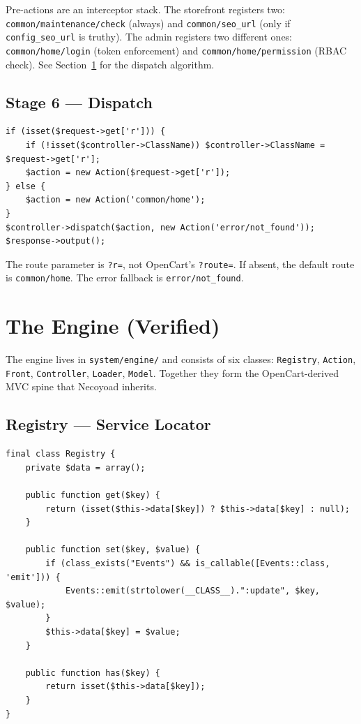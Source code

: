 \documentclass[11pt,a4paper]{article}
\begin{document}
Pre-actions are an interceptor stack. The storefront registers two:
\texttt{common/maintenance/check} (always) and \texttt{common/seo\_url}
(only if \texttt{config\_seo\_url} is truthy). The admin registers
two different ones: \texttt{common/home/login} (token enforcement)
and \texttt{common/home/permission} (RBAC check). See
Section~\ref{sec:engine} for the dispatch algorithm.

\subsection{Stage 6 --- Dispatch}

\begin{lstlisting}[caption={Dispatch in \texttt{web/index.php}.},label={lst:dispatch}]
if (isset($request->get['r'])) {
    if (!isset($controller->ClassName)) $controller->ClassName = $request->get['r'];
    $action = new Action($request->get['r']);
} else {
    $action = new Action('common/home');
}
$controller->dispatch($action, new Action('error/not_found'));
$response->output();
\end{lstlisting}

The route parameter is \texttt{?r=}, not OpenCart's \texttt{?route=}.
If absent, the default route is \texttt{common/home}. The error
fallback is \texttt{error/not\_found}.

\section{The Engine (Verified)}\label{sec:engine}

The engine lives in \texttt{system/engine/} and consists of six
classes: \texttt{Registry}, \texttt{Action}, \texttt{Front},
\texttt{Controller}, \texttt{Loader}, \texttt{Model}. Together they
form the OpenCart-derived MVC spine that Necoyoad inherits.

\subsection{Registry --- Service Locator}

\begin{lstlisting}[caption={\texttt{system/engine/registry.php} --- the entire class.},label={lst:registry}]
final class Registry {
    private $data = array();

    public function get($key) {
        return (isset($this->data[$key]) ? $this->data[$key] : null);
    }

    public function set($key, $value) {
        if (class_exists("Events") && is_callable([Events::class, 'emit'])) {
            Events::emit(strtolower(__CLASS__).":update", $key, $value);
        }
        $this->data[$key] = $value;
    }

    public function has($key) {
        return isset($this->data[$key]);
    }
}
\end{lstlisting}
\end{document}
